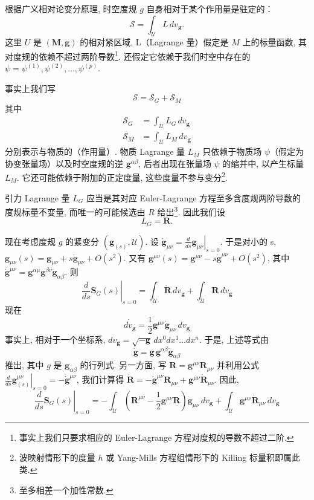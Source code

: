 
根据广义相对论变分原理, 时空度规 $g$ 自身相对于某个作用量是驻定的：
\[
\mathcal{S} = \int_{\mathcal{U}}L\, dv_{\mathbf{g}}.
\]
这里 $U$ 是 $(\mathbf{M}, \mathbf{g})$ 的相对紧区域, L（Lagrange 量）假定是 $M$ 上的标量函数, 其对度规的依赖不超过两阶导数\footnote{事实上我们只要求相应的 Euler-Lagrange 方程对度规的导数不超过二阶. }. 还假定它依赖于我们时空中存在的  $\psi = \psi^{(1)}, \psi^{(2)}, \dots, \psi^{(p)}$. 

事实上我们写
\[
\mathcal{S} = \mathcal{S}_G + \mathcal{S}_M
\]
其中
\[
\begin{aligned}
\mathcal{S}_G &= \int_{\mathcal{U}}L_G\, dv_{\mathbf{g}}\\
\mathcal{S}_M &= \int_{\mathcal{U}}L_M\, dv_{\mathbf{g}}
\end{aligned}
\]
分别表示与物质的（作用量）. 物质 Lagrange 量 $L_M$ 只依赖于物质场 $\psi$（假定为协变张量场）以及时空度规的逆 $\mathbf{g}^{\alpha\beta}$, 后者出现在张量场 $\psi$ 的缩并中, 以产生标量 $L_M$. 它还可能依赖于附加的正定度量, 这些度量不参与变分\footnote{波映射情形下的度量 $h$ 或 Yang-Mills 方程组情形下的 Killing 标量积即属此类. }. 

引力 Lagrange 量 $L_G$ 应当是其对应 Euler-Lagrange 方程至多含度规两阶导数的度规标量不变量, 而唯一的可能候选由 $R$ 给出\footnote{至多相差一个加性常数. }. 因此我们设
\[
L_G = \mathbf{R}.
\]

现在考虑度规 $g$ 的紧变分 $(\mathbf{g}_{(s)}, \mathcal{U})$. 设 $\dot{\mathbf{g}}_{\mu\nu} = \left.\frac{d}{ds}\mathbf{g}_{\mu\nu}\right|_{s=0}$. 于是对小的 s, $\mathbf{g}_{\mu\nu}(s) = \mathbf{g}_{\mu\nu} + s\dot{\mathbf{g}}_{\mu\nu} + O(s^2)$. 又有 $\mathbf{g}^{\mu\nu}(s) = \mathbf{g}^{\mu\nu} - s\dot{\mathbf{g}}^{\mu\nu} + O(s^2)$, 其中 $\dot{\mathbf{g}}^{\mu\nu} = \mathbf{g}^{\alpha\mu}\mathbf{g}^{\beta\nu}\dot{\mathbf{g}}_{\alpha\beta}$. 则
\[
\left.\frac{d}{ds}\mathbf{S}_G(s)\right|_{s=0} = \int_{\mathcal{U}}\dot{\mathbf{R}}\, dv_{\mathbf{g}} + \int_{\mathcal{U}}\mathbf{R}\, d\dot{v}_{\mathbf{g}}
\]
现在
\[
\dot{dv_{\mathbf{g}}} = \frac{1}{2}\mathbf{g}^{\mu\nu}\dot{\mathbf{g}}_{\mu\nu}\, dv_{\mathbf{g}}
\]
事实上, 相对于一个坐标系, $dv_{\mathbf{g}} = \sqrt{-\mathbf{g}}\, dx^0dx^1\ldots dx^n$. 于是, 上述等式由
\[
\dot{\mathbf{g}} = \mathbf{g}\, \mathbf{g}^{\alpha\beta}\dot{\mathbf{g}}_{\alpha\beta}
\]
推出, 其中 $g$ 是 $\mathbf{g}_{\alpha\beta}$ 的行列式. 另一方面, 写 $\mathbf{R} = \mathbf{g}^{\mu\nu}\mathbf{R}_{\mu\nu}$ 并利用公式 $\left.\frac{d}{ds}\mathbf{g}_{(s)}^{\mu\nu}\right|_{s=0} = -\dot{\mathbf{g}}^{\mu\nu}$, 我们计算得 $\dot{\mathbf{R}} = -\dot{\mathbf{g}}^{\mu\nu}\mathbf{R}_{\mu\nu} + \mathbf{g}^{\mu\nu}\dot{\mathbf{R}}_{\mu\nu}$. 因此, 
\begin{equation}
\left.\frac{d}{ds}\mathbf{S}_G(s)\right|_{s=0} = -\int_{\mathcal{U}}\left(\mathbf{R}^{\mu\nu} - \frac{1}{2}\mathbf{g}^{\mu\nu}\mathbf{R}\right)\dot{\mathbf{g}}_{\mu\nu}\, dv_{\mathbf{g}} + \int_{\mathcal{U}}\mathbf{g}^{\mu\nu}\dot{\mathbf{R}}_{\mu\nu}\, dv_{\mathbf{g}}\label{eq:c1-59}
\end{equation}

